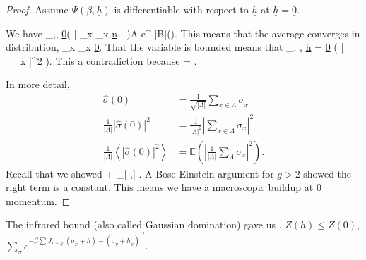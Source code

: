 \begin{proof}
Assume $\Psi(\beta, \underline{h})$ is differentiable with respect to $\underline{h}$ at $\underline{h}=\underline{0}$. 

We have 
\be
{}_{\Lambda,\beta, \underline{0}}\left( {
\left| {\sum_{x\in \Lambda} \underline{\sigma}_x \cdot \underline{n}\ge \varepsilon 
} \right|} \right)\le A e^{-|B|\delta(\varepsilon)}.
\ee
This means that the average converges in distribution,
\be
{}\sum_{x\in \Lambda} \underline{\sigma}_x  \underline{0}.
\ee
That the variable is bounded means that
\be
{}_{\Lambda, \beta, \underline{h} = \underline{0}} \left( {\left| { \sum_\Lambda \underline{\sigma}_x} \right|^2} \right).
\ee
This a contradiction because 
\be
\left{}\right\rangle =  \sigma.
\ee

In more detail,
\begin{align}
\widehat{\underline{\sigma}}(0)& = \frac{1}{\sqrt{|\Lambda|}} \sum_{x\in \Lambda} \underline{\sigma}_x\\
\frac{1}{|\Lambda|}|\widehat{\sigma}(0)|^2 &= \frac{1}{|\Lambda|^2} \left| {\sum_{x\in \Lambda} \sigma_x} \right|^2\\
\frac{1}{|\Lambda|} \left\langle {|\widehat{\sigma}(0)|^2}\right\rangle &= \mathbb{E}\left( {\left| {\frac{1}{|\Lambda|} \sum_\Lambda \sigma_x} \right|^2} \right).
\end{align}
Recall that we showed
\le {} \left{}\right\rangle +  \int_{[-\pi,\pi]}  .
\ee
A Bose-Einstein argument for $g>2$ showed the right term is a constant. This means we have a macroscopic buildup at 0 momentum.
\end{proof}


The infrared bound (also called Gaussian domination) gave us
\be
\left{}\right\rangle \le {}.
\ee
$Z(h)\le Z(\underline{0})$, $\sum_\sigma e^{-\beta \sum J_{x-y} |(\underline{\sigma}_x + \underline{h})- (\underline{\sigma}_y+\underline{h}_x)|^2}$.


